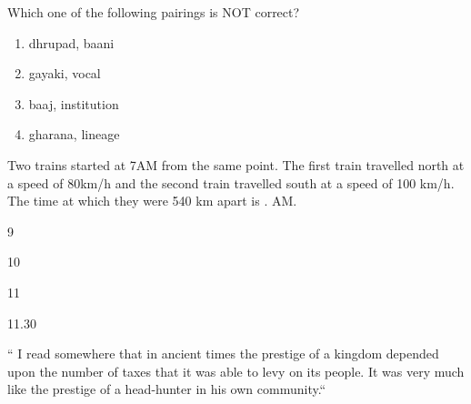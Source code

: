 Which one of the following pairings is NOT correct?
\begin{enumerate}
\item dhrupad, baani
\item gayaki, vocal
\item baaj, institution
\item gharana, lineage
\end{enumerate}
\item  Two trains started at 7AM from the same point. The first train travelled north at a speed of 
80km/h and the second train travelled south at a speed of 100 km/h. The time at which they were 540 km apart is .\underline{\hspace{1cm}} AM.
\begin{enumerate}
\begin{multicols}{4}
\item 9
\item 10
\item 11
\item 11.30
\end{multicols}
\end{enumerate}
\item `` I read somewhere that in ancient times the prestige of a kingdom depended upon the number of taxes that it was able to levy on its people. It was very much like the prestige of a head-hunter in his own community.``

